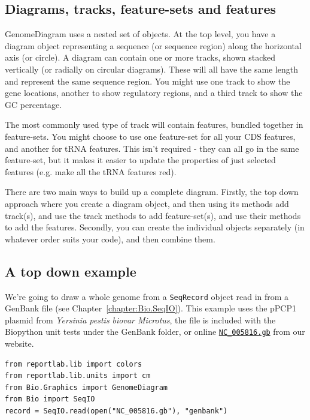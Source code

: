 \documentclass{report}
\begin{document}
\subsection{Diagrams, tracks, feature-sets and features}

GenomeDiagram uses a nested set of objects.  At the top level, you have a diagram
object representing a sequence (or sequence region) along the horizontal axis (or
circle).  A diagram can contain one or more tracks, shown stacked vertically (or
radially on circular diagrams).  These will all have the same length and represent
the same sequence region.  You might use one track to show the gene locations,
another to show regulatory regions, and a third track to show the GC percentage.

The most commonly used type of track will contain features, bundled together in
feature-sets.  You might choose to use one feature-set for all your CDS features,
and another for tRNA features.  This isn't required - they can all go in the same
feature-set, but it makes it easier to update the properties of just selected
features (e.g. make all the tRNA features red).

There are two main ways to build up a complete diagram.  Firstly, the top down
approach where you create a diagram object, and then using its methods add
track(s), and use the track methods to add feature-set(s), and use their
methods to add the features.  Secondly, you can create the individual objects
separately (in whatever order suits your code), and then combine them.

\subsection{A top down example}
\label{sec:gd_top_down}

We're going to draw a whole genome from a \verb|SeqRecord| object read in from
a GenBank file (see Chapter~\ref{chapter:Bio.SeqIO}).  This example uses the
pPCP1 plasmid from \textit{Yersinia pestis biovar Microtus}, the file is
included with the Biopython unit tests under the GenBank folder, or online
\href{http://biopython.org/SRC/biopython/Tests/GenBank/NC_005816.gb}
{\texttt{NC\_005816.gb}} from our website.

\begin{verbatim}
from reportlab.lib import colors
from reportlab.lib.units import cm
from Bio.Graphics import GenomeDiagram
from Bio import SeqIO
record = SeqIO.read(open("NC_005816.gb"), "genbank")
\end{verbatim}
\end{document}
